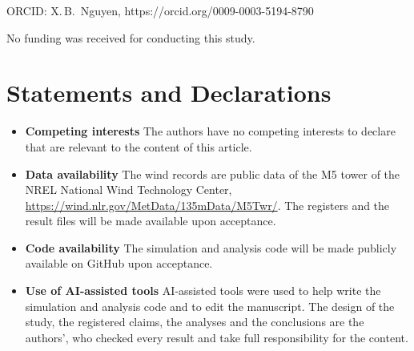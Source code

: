 \documentclass[12pt]{sn-jnl}%
\begin{document}

\maketitle

\noindent ORCID: X.\,B.~Nguyen, https://orcid.org/0009-0003-5194-8790

\backmatter


No funding was received for conducting this study.

\section*{Statements and Declarations}
\begin{itemize}
\item \textbf{Competing interests} The authors have no competing interests to declare that are relevant to the
  content of this article.
\item \textbf{Data availability} The wind records are public data of the M5 tower of the NREL National Wind Technology
  Center, \url{https://wind.nlr.gov/MetData/135mData/M5Twr/}. The registers and the result files will be made
  available upon acceptance.
\item \textbf{Code availability} The simulation and analysis code will be made publicly available on GitHub upon
  acceptance.
\item \textbf{Use of AI-assisted tools} AI-assisted tools were used to help write the simulation and analysis code
  and to edit the manuscript. The design of the study, the registered claims, the analyses and the conclusions are the
  authors', who checked every result and take full responsibility for the content.
\end{itemize}
\end{document}
